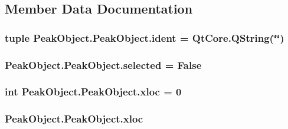 \subsection{Member Data Documentation}
\hypertarget{class_peak_object_1_1_peak_object_a5d69241780c9ba49bccd1a76c3ef2738}{
\subsubsection[{ident}]{\setlength{\rightskip}{0pt plus 5cm}tuple Peak\-Object.\-Peak\-Object.\-ident = Qt\-Core.\-Q\-String(\char`\"{}\char`\"{})\hspace{0.3cm}{\ttfamily [static]}}}\label{class_peak_object_1_1_peak_object_a5d69241780c9ba49bccd1a76c3ef2738}
\hypertarget{class_peak_object_1_1_peak_object_aa0095eabde0eeb9ed146a052f7dea921}{
\subsubsection[{selected}]{\setlength{\rightskip}{0pt plus 5cm}Peak\-Object.\-Peak\-Object.\-selected = False\hspace{0.3cm}{\ttfamily [static]}}}\label{class_peak_object_1_1_peak_object_aa0095eabde0eeb9ed146a052f7dea921}
\hypertarget{class_peak_object_1_1_peak_object_a547374a82aab09bcf28e13ecfb598117}{
\subsubsection[{xloc}]{\setlength{\rightskip}{0pt plus 5cm}int Peak\-Object.\-Peak\-Object.\-xloc = 0\hspace{0.3cm}{\ttfamily [static]}}}\label{class_peak_object_1_1_peak_object_a547374a82aab09bcf28e13ecfb598117}
\hypertarget{class_peak_object_1_1_peak_object_a0675bfef330cb0e7111c507d0fd2f505}{
\subsubsection[{xloc}]{\setlength{\rightskip}{0pt plus 5cm}Peak\-Object.\-Peak\-Object.\-xloc}}\label{class_peak_object_1_1_peak_object_a0675bfef330cb0e7111c507d0fd2f505}
